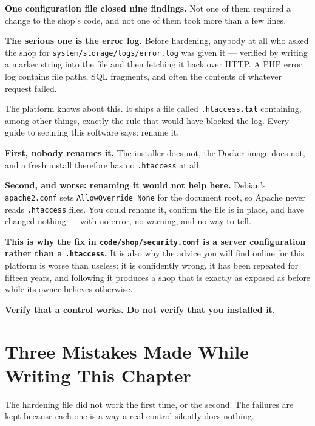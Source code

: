 \begin{measured}
\smallskip
\textbf{One configuration file closed nine findings.} Not one of them required
a change to the shop's code, and not one of them took more than a few lines.

\smallskip
\textbf{The serious one is the error log.} Before hardening, anybody at all who
asked the shop for \texttt{system/storage/logs/error.log} was given it ---
verified by writing a marker string into the file and then fetching it back
over HTTP. A PHP error log contains file paths, SQL fragments, and often the
contents of whatever request failed.
\end{measured}

\begin{alertbox}
The platform knows about this. It ships a file called
\texttt{.htaccess\textbf{.txt}} containing, among other things, exactly the rule
that would have blocked the log. Every guide to securing this software says:
rename it.

\smallskip
\textbf{First, nobody renames it.} The installer does not, the Docker image does
not, and a fresh install therefore has no \texttt{.htaccess} at all.

\smallskip
\textbf{Second, and worse: renaming it would not help here.} Debian's
\texttt{apache2.conf} sets \texttt{AllowOverride None} for the document root,
so Apache never reads \texttt{.htaccess} files. You could rename it, confirm
the file is in place, and have changed nothing --- with no error, no warning,
and no way to tell.

\smallskip
\textbf{This is why the fix in \texttt{code/shop/security.conf} is a server
configuration rather than a \texttt{.htaccess}.} It is also why the advice you
will find online for this platform is worse than useless: it is confidently
wrong, it has been repeated for fifteen years, and following it produces a
shop that is exactly as exposed as before while its owner believes otherwise.

\smallskip
\textbf{Verify that a control works. Do not verify that you installed it.}
\end{alertbox}

\section{Three Mistakes Made While Writing This Chapter}

The hardening file did not work the first time, or the second. The failures are
kept because each one is a way a real control silently does nothing.

